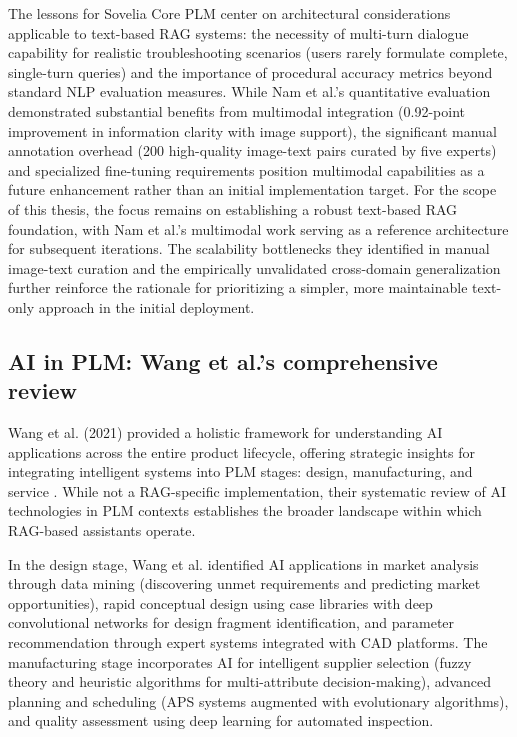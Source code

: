 The lessons for Sovelia Core PLM center on architectural considerations applicable to text-based RAG systems: the necessity of multi-turn dialogue capability for realistic troubleshooting scenarios (users rarely formulate complete, single-turn queries) and the importance of procedural accuracy metrics beyond standard NLP evaluation measures. While Nam et al.'s quantitative evaluation demonstrated substantial benefits from multimodal integration (0.92-point improvement in information clarity with image support), the significant manual annotation overhead (200 high-quality image-text pairs curated by five experts) and specialized fine-tuning requirements position multimodal capabilities as a future enhancement rather than an initial implementation target. For the scope of this thesis, the focus remains on establishing a robust text-based RAG foundation, with Nam et al.'s multimodal work serving as a reference architecture for subsequent iterations. The scalability bottlenecks they identified in manual image-text curation and the empirically unvalidated cross-domain generalization further reinforce the rationale for prioritizing a simpler, more maintainable text-only approach in the initial deployment.

\subsection{AI in PLM: Wang et al.'s comprehensive review}

Wang et al. (2021) provided a holistic framework for understanding AI applications across the entire product lifecycle, offering strategic insights for integrating intelligent systems into PLM stages: design, manufacturing, and service \parencite{wang_artificial_2021}. While not a RAG-specific implementation, their systematic review of AI technologies in PLM contexts establishes the broader landscape within which RAG-based assistants operate.

In the design stage, Wang et al. identified AI applications in market analysis through data mining (discovering unmet requirements and predicting market opportunities), rapid conceptual design using case libraries with deep convolutional networks for design fragment identification, and parameter recommendation through expert systems integrated with CAD platforms. The manufacturing stage incorporates AI for intelligent supplier selection (fuzzy theory and heuristic algorithms for multi-attribute decision-making), advanced planning and scheduling (APS systems augmented with evolutionary algorithms), and quality assessment using deep learning for automated inspection.


